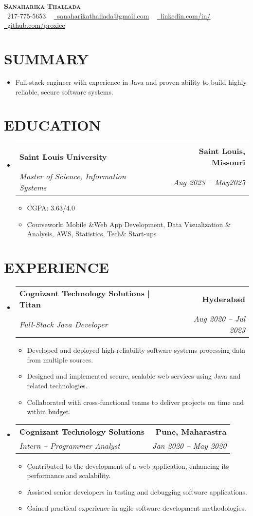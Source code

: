 \documentclass[letterpaper,11pt]{article}
\makeatletter
\newcommand{\resumeItem}[1]{\item\small{{#1 \vspace{-3pt}}}}
\newcommand{\resumeSubheading}[4]{\vspace{-2pt}\item\begin{tabular*}{0.97\textwidth}[t]{l@{\extracolsep{\fill}}r}\textbf{#1} & #2 \\ \textit{\small#3} & \textit{\small #4} \\ \end{tabular*}\vspace{-7pt}}
\newcommand{\resumeSubHeadingListStart}{\begin{itemize}[leftmargin=0.15in, label={}]}
\newcommand{\resumeSubHeadingListEnd}{\end{itemize}}
\newcommand{\resumeItemListStart}{\begin{itemize}}
\newcommand{\resumeItemListEnd}{\end{itemize}\vspace{-5pt}}
\makeatother
\begin{document}
\begin{center}
    \textbf{\Huge \scshape {\fontsize{15pt}{20pt}\selectfont Sanaharika Thallada}} \\ \vspace{1pt}
    \small \raisebox{-0.1\height}\faPhone\ 217-775-5653 ~ \href{mailto:sanaharikathallada@gmail.com}{\raisebox{-0.2\height}\faEnvelope\  \underline{sanaharikathallada@gmail.com}} ~ 
    \href{https://www.linkedin.com/in/yashwanthtirupati/}{\raisebox{-0.2\height}\faLinkedin\ \underline{linkedin.com/in/}} ~ 
    \href{https://github.com/proxiee}{\raisebox{-0.2\height}\faGithub\ \underline{github.com/proxiee}}
    \vspace{-8pt}
\end{center}

\section{{\fontsize{9pt}{20pt}\selectfont \textbf{SUMMARY}}}\resumeSubHeadingListStart
\resumeItem{Full-stack engineer with experience in Java and proven ability to build highly reliable, secure software systems.}
\resumeSubHeadingListEnd\vspace{-18pt}
\section{{\fontsize{9pt}{20pt}\selectfont \textbf{EDUCATION}}}\resumeSubHeadingListStart
\resumeSubheading{Saint Louis University}{\textbf{Saint Louis, Missouri}}{Master of Science, Information Systems}{Aug 2023 – May2025}
\resumeItemListStart
\resumeItem{CGPA: 3.63/4.0}
\resumeItem{Coursework: Mobile \&Web App Development, Data Visualization \& Analysis, AWS, Statistics, Tech\& Start-ups}
\resumeItemListEnd
\resumeSubHeadingListEnd\vspace{-18pt}
\section{{\fontsize{9pt}{20pt}\selectfont \textbf{EXPERIENCE}}}\resumeSubHeadingListStart
\resumeSubheading{Cognizant Technology Solutions | Titan}{\textbf{Hyderabad}}{Full-Stack Java Developer}{Aug 2020 – Jul 2023}
\resumeItemListStart
\resumeItem{Developed and deployed high-reliability software systems processing data from multiple sources.}
\resumeItem{Designed and implemented secure, scalable web services using Java and related technologies.}
\resumeItem{Collaborated with cross-functional teams to deliver projects on time and within budget.}
\resumeItemListEnd
\resumeSubheading{Cognizant Technology Solutions}{\textbf{Pune, Maharastra}}{Intern – Programmer Analyst}{Jan 2020 – May 2020}
\resumeItemListStart
\resumeItem{Contributed to the development of a web application, enhancing its performance and scalability.}
\resumeItem{Assisted senior developers in testing and debugging software applications.}
\resumeItem{Gained practical experience in agile software development methodologies.}
\resumeItemListEnd
\resumeSubHeadingListEnd\vspace{-17pt}
\end{document}
